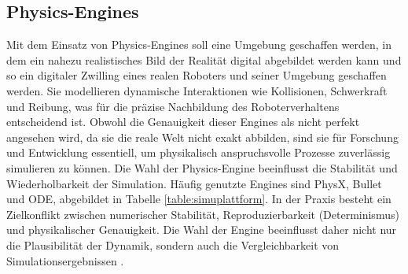 \subsection{Physics-Engines}
Mit dem Einsatz von {Physics-Engines} soll eine Umgebung geschaffen werden, in
dem ein nahezu realistisches Bild der Realität digital abgebildet werden kann
und so ein digitaler Zwilling eines realen Roboters und seiner Umgebung
geschaffen werden. Sie modellieren dynamische Interaktionen wie Kollisionen,
Schwerkraft und Reibung, was für die präzise Nachbildung des Roboterverhaltens
entscheidend ist. Obwohl die Genauigkeit dieser Engines als nicht perfekt
angesehen wird, da sie die reale Welt nicht exakt abbilden, sind sie für
Forschung und Entwicklung essentiell, um physikalisch anspruchsvolle Prozesse
zuverlässig simulieren zu können. Die Wahl der Physics-Engine beeinflusst die Stabilität und Wiederholbarkeit der
Simulation. Häufig genutzte Engines sind PhysX, Bullet und ODE, abgebildet in
Tabelle \ref{table:simuplattform}.
\noindent
In der Praxis besteht ein Zielkonflikt zwischen numerischer Stabilität,
Reproduzierbarkeit (Determinismus) und physikalischer Genauigkeit. Die Wahl der
Engine beeinflusst daher nicht nur die Plausibilität der Dynamik, sondern auch
die Vergleichbarkeit von Simulationsergebnissen .

